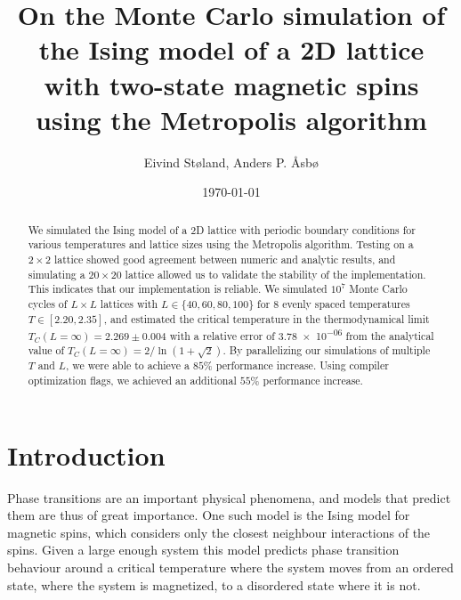 \documentclass[reprint,english,notitlepage]{revtex4-1}  %
\begin{document}
\title{On the Monte Carlo simulation of the Ising model of a 2D lattice with two-state magnetic spins using the Metropolis algorithm}   %
\author{Eivind Støland, Anders P. Åsbø}               %
\date{\today}                             %
\noaffiliation                            %

\begin{abstract}
We simulated the Ising model of a 2D lattice with periodic boundary conditions for various temperatures and lattice sizes using the Metropolis algorithm. Testing on a \(2 \times 2\) lattice showed good agreement between numeric and analytic results, and simulating a $20 \times 20$ lattice allowed us to validate the stability of the implementation. This indicates that our implementation is reliable. We simulated \(10^{7}\) Monte Carlo cycles of \(L\times L\) lattices with \(L \in \{40, 60, 80, 100\}\) for \(8\) evenly spaced temperatures \(T \in [2.20, 2.35]\), and estimated the critical temperature in the thermodynamical limit $T_C(L=\infty) = 2.269 \pm 0.004$ with a relative error of \num{3.78e-06} from the analytical value of $T_C(L=\infty) = 2/\ln(1 + \sqrt{2})$. By parallelizing our simulations of multiple \(T\) and \(L\), we were able to achieve a \(85\%\) performance increase. Using compiler optimization flags, we achieved an additional \(55\%\) performance increase.
\end{abstract}

\maketitle                                %


\tableofcontents

\section{Introduction} \label{sec:I}

Phase transitions are an important physical phenomena, and models that predict them are thus of great importance. One such model is the Ising model for magnetic spins, which considers only the closest neighbour interactions of the spins. Given a large enough system this model predicts phase transition behaviour around a critical temperature where the system moves from an ordered state, where the system is magnetized, to a disordered state where it is not.
\end{document}
